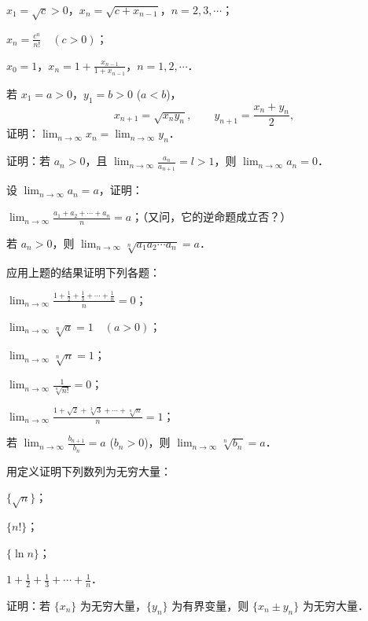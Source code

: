\begin{xiti}
\begin{ziti}
  \item $x_1 = \sqrt{c} > 0$，$x_n = \sqrt{c + x_{n-1}}$，$n=2,3,\cdots$；
  \item $x_n = \frac{c^n}{n!}\quad (c > 0)$；
  \item $x_0 = 1$，$x_n = 1 + \frac{x_{n-1}}{1 + x_{n-1}}$，$n=1,2,\cdots$．
  \end{ziti}
\item 若 $x_1 = a > 0$，$y_1 = b > 0$ ($a < b$)，
\[
x_{n+1} = \sqrt{x_n y_n},\qquad y_{n+1} = \frac{x_n + y_n}{2},
\]
证明：$\lim_{n\to\infty}x_n = \lim_{n\to\infty}y_n$．
\item 证明：若 $a_n > 0$，且 $\lim_{n\to\infty}\frac{a_n}{a_{n+1}} = l > 1$，则 $\lim_{n\to\infty}a_n = 0$．
\item 设 $\lim_{n\to\infty}a_n = a$，证明：
  \begin{ziti}
  \item $\lim_{n\to\infty}\frac{a_1 + a_2 + \cdots + a_n}{n} = a$；（又问，它的逆命题成立否？）
  \item 若 $a_n > 0$，则 $\lim_{n \to \infty} \sqrt[n]{a_1 a_2 \cdots a_n} = a$．
  \end{ziti}
\item 应用上题的结果证明下列各题：
  \begin{ziti}
  \item $\lim_{n \to \infty} \frac{1 + \frac{1}{2} + \frac{1}{3} + \cdots + \frac{1}{n}}{n} = 0$；
  \item $\lim_{n \to \infty} \sqrt[n]{a} = 1\quad (a > 0)$；
  \item $\lim_{n \to \infty} \sqrt[n]{n} = 1$；
  \item $\lim_{n \to \infty} \frac{1}{\sqrt[n]{n!}} = 0$；
  \item $\lim_{n \to \infty} \frac{1 + \sqrt{2} + \sqrt[3]{3} + \cdots + \sqrt[n]{n}}{n} = 1$；
  \item 若 $\lim_{n\to\infty}\frac{b_{n+1}}{b_n} = a$ ($b_n > 0$)，则 $\lim_{n\to\infty}\sqrt[n]{b_n} = a$．
  \end{ziti}
\item 用定义证明下列数列为无穷大量：
  \begin{ziti}
  \item $\{\sqrt{n}\}$；
  \item $\{n!\}$；
  \item $\{\ln n\}$；
  \item $1 + \frac{1}{2} + \frac{1}{3} + \cdots + \frac{1}{n}$．
  \end{ziti}
\item 证明：若 $\{x_n\}$ 为无穷大量，$\{y_n\}$ 为有界变量，则 $\{x_n \pm y_n\}$ 为无穷大量．

\end{xiti}
